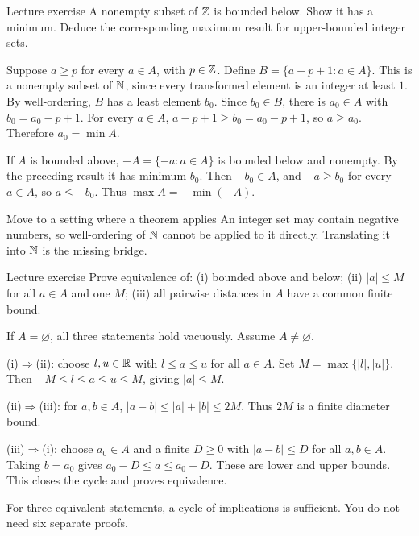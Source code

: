 \begin{exam}{Lecture exercise}
A nonempty subset of $\mathbb Z$ is bounded below. Show it has a minimum. Deduce the corresponding maximum result for upper-bounded integer sets.
\end{exam}
\begin{answer}
Suppose $a\ge p$ for every $a\in A$, with $p\in\mathbb Z$. Define $B=\{a-p+1:a\in A\}$. This is a nonempty subset of $\mathbb N$, since every transformed element is an integer at least $1$. By well-ordering, $B$ has a least element $b_0$. Since $b_0\in B$, there is $a_0\in A$ with $b_0=a_0-p+1$. For every $a\in A$, $a-p+1\ge b_0=a_0-p+1$, so $a\ge a_0$. Therefore $a_0=\min A$.

If $A$ is bounded above, $-A=\{-a:a\in A\}$ is bounded below and nonempty. By the preceding result it has minimum $b_0$. Then $-b_0\in A$, and $-a\ge b_0$ for every $a\in A$, so $a\le-b_0$. Thus $\max A=-\min(-A)$.
\end{answer}
\begin{method}{Move to a setting where a theorem applies}
An integer set may contain negative numbers, so well-ordering of $\mathbb N$ cannot be applied to it directly. Translating it into $\mathbb N$ is the missing bridge.
\end{method}
\begin{exam}{Lecture exercise}
Prove equivalence of: (i) bounded above and below; (ii) $|a|\le M$ for all $a\in A$ and one $M$; (iii) all pairwise distances in $A$ have a common finite bound.
\end{exam}
\begin{answer}
If $A=\varnothing$, all three statements hold vacuously. Assume $A\ne\varnothing$.

(i)$\Rightarrow$(ii): choose $l,u\in\mathbb R$ with $l\le a\le u$ for all $a\in A$. Set $M=\max\{|l|,|u|\}$. Then $-M\le l\le a\le u\le M$, giving $|a|\le M$.

(ii)$\Rightarrow$(iii): for $a,b\in A$, $|a-b|\le|a|+|b|\le2M$. Thus $2M$ is a finite diameter bound.

(iii)$\Rightarrow$(i): choose $a_0\in A$ and a finite $D\ge0$ with $|a-b|\le D$ for all $a,b\in A$. Taking $b=a_0$ gives $a_0-D\le a\le a_0+D$. These are lower and upper bounds. This closes the cycle and proves equivalence.
\end{answer}
\begin{tip}
For three equivalent statements, a cycle of implications is sufficient. You do not need six separate proofs.
\end{tip}

